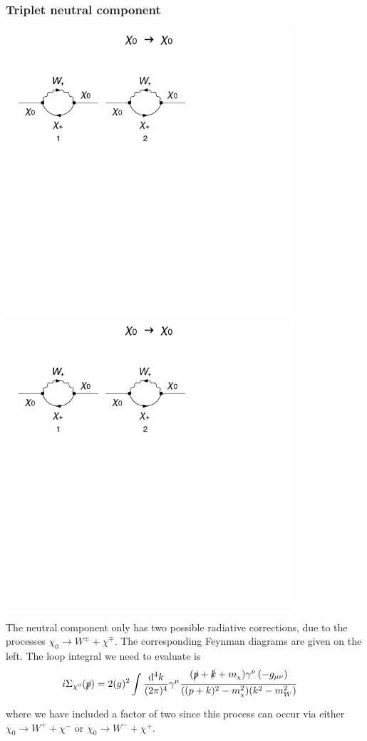 \documentclass[11pt]{article}
\newcommand{\mychi}{\raisebox{0pt}[1ex][1ex]{\tiny$\chi$}}
\def\cn{\chi^0}
\renewcommand{\d}{\ensuremath{\operatorname{d}\!}}
\def\mc{m_{\mychi}}
\begin{document}
\subsubsection{Triplet neutral component}
\noindent\begin{minipage}{0.3\textwidth}
\includegraphics[width=0.8\textwidth]{1loop_a.pdf}\\
\includegraphics[width=0.8\textwidth]{1loop_b.pdf}
\end{minipage}
\noindent\begin{minipage}{0.7\textwidth}

The neutral component only has two possible radiative corrections, due to the processes $\chi_0\rightarrow W^{\pm} + \chi^{\mp}$.  The corresponding Feynman diagrams are given on the left.  The loop integral we need to evaluate is
\begin{align}
i\Sigma_{\cn}(\slashed{p})&= 2 (g)^2 \int \frac{\d^4k}{(2\pi)^4} \gamma^{\mu}\frac{(\slashed{p}+\slashed{k}+\mc)\gamma^{\nu}\left(-g_{\mu\nu}\right)}{((p+k)^2-\mc^2)(k^2-m_W^2)}\label{eqn:cn_loop}
\end{align}
where we have included a factor of two since this process can occur via either $\chi_0\rightarrow W^+ + \chi^-$ or $\chi_0\rightarrow W^- + \chi^+$.  
\end{minipage}
\end{document}
